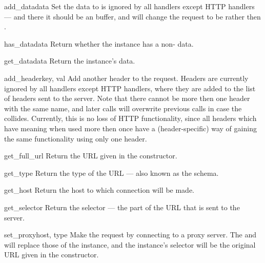 \begin{methoddesc}[Request]{add_data}{data}
Set the  data to  is ignored
by all handlers except HTTP handlers --- and there it should be an
 buffer, and will change the
request to be  rather then . 
\end{methoddesc}

\begin{methoddesc}[Request]{has_data}{data}
Return whether the instance has a non- data.
\end{methoddesc}

\begin{methoddesc}[Request]{get_data}{data}
Return the instance's data.
\end{methoddesc}

\begin{methoddesc}[Request]{add_header}{key, val}
Add another header to the request. Headers
are currently ignored by all handlers except HTTP handlers, where they
are added to the list of headers sent to the server. Note that there
cannot be more then one header with the same name, and later calls
will overwrite previous calls in case the  collides. Currently, 
this is no loss of HTTP functionality, since all headers which have meaning
when used more then once have a (header-specific) way of gaining the
same functionality using only one header.
\end{methoddesc}

\begin{methoddesc}[Request]{get_full_url}{}
Return the URL given in the constructor.
\end{methoddesc}

\begin{methoddesc}[Request]{get_type}{}
Return the type of the URL --- also known as the schema.
\end{methoddesc}

\begin{methoddesc}[Request]{get_host}{}
Return the host to which connection will be made.
\end{methoddesc}

\begin{methoddesc}[Request]{get_selector}{}
Return the selector --- the part of the URL that is sent to
the server.
\end{methoddesc}

\begin{methoddesc}[Request]{set_proxy}{host, type}
Make the request by connecting to a proxy server. The  and 
will replace those of the instance, and the instance's selector will be
the original URL given in the constructor.
\end{methoddesc}

